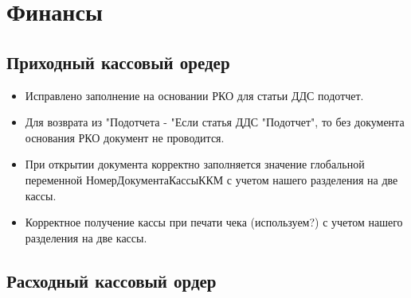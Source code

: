 \section{Финансы}
\subsection{Приходный кассовый оредер}


\begin{itemize}
	\item Исправлено заполнение на основании РКО для статьи ДДС подотчет.
	\item Для возврата из "Подотчета - "Если статья ДДС "Подотчет", то без документа основания РКО документ не проводится.
	\item При открытии документа корректно заполняется значение глобальной переменной НомерДокументаКассыККМ
	с учетом нашего разделения на две кассы. 
	\item Корректное получение кассы при печати чека (используем?)
	с учетом нашего разделения на две кассы. 
\end{itemize}

\subsection{Расходный кассовый ордер}

